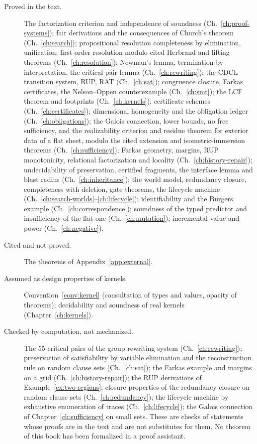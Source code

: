 \begin{description}
\item[Proved in the text.] The factorization criterion and independence of soundness (Ch.~\ref{ch:proof-systems}); fair derivations and the consequences of Church's theorem (Ch.~\ref{ch:search}); propositional resolution completeness by elimination, unification, first-order resolution modulo cited Herbrand and lifting theorems (Ch.~\ref{ch:resolution}); Newman's lemma, termination by interpretation, the critical pair lemma (Ch.~\ref{ch:rewriting}); the CDCL transition system, RUP, RAT (Ch.~\ref{ch:sat}); congruence closure, Farkas certificates, the Nelson--Oppen counterexample (Ch.~\ref{ch:smt}); the LCF theorem and footprints (Ch.~\ref{ch:kernels}); certificate schemes (Ch.~\ref{ch:certificates}); dimensional homogeneity and the obligation ledger (Ch.~\ref{ch:obligations}); the Galois connection, lower bounds, no free sufficiency, and the realizability criterion and residue theorem for exterior data of a flat sheet, modulo the cited extension and isometric-immersion theorems (Ch.~\ref{ch:sufficiency}); Farkas geometry, margins, RUP monotonicity, relational factorization and locality (Ch.~\ref{ch:history-repair}); undecidability of preservation, certified fragments, the interface lemma and blast radius (Ch.~\ref{ch:inheritance}); the world model, redundancy closure, completeness with deletion, gate theorems, the lifecycle machine (Ch.~\ref{ch:search-worlds}--\ref{ch:lifecycle}); identifiability and the Burgers example (Ch.~\ref{ch:correspondence}); soundness of the typed predictor and insufficiency of the flat one (Ch.~\ref{ch:mutation}); incremental value and power (Ch.~\ref{ch:negative}).
\item[Cited and not proved.] The theorems of Appendix~\ref{app:external}.
\item[Assumed as design properties of kernels.] Convention~\ref{conv:kernel} (consultation of types and values, opacity of theorems); decidability and soundness of real kernels (Chapter~\ref{ch:kernels}).
\item[Checked by computation, not mechanized.] The 55 critical pairs of the group rewriting system (Ch.~\ref{ch:rewriting}); preservation of satisfiability by variable elimination and the reconstruction rule on random clause sets (Ch.~\ref{ch:sat}); the Farkas example and margins on a grid (Ch.~\ref{ch:history-repair}); the RUP derivations of Example~\ref{ex:two-regions}; closure properties of the redundancy closure on random clause sets (Ch.~\ref{ch:redundancy}); the lifecycle machine by exhaustive enumeration of traces (Ch.~\ref{ch:lifecycle}); the Galois connection of Chapter~\ref{ch:sufficiency} on small sets. These are checks of statements whose proofs are in the text and are not substitutes for them. No theorem of this book has been formalized in a proof assistant.

\end{description}
